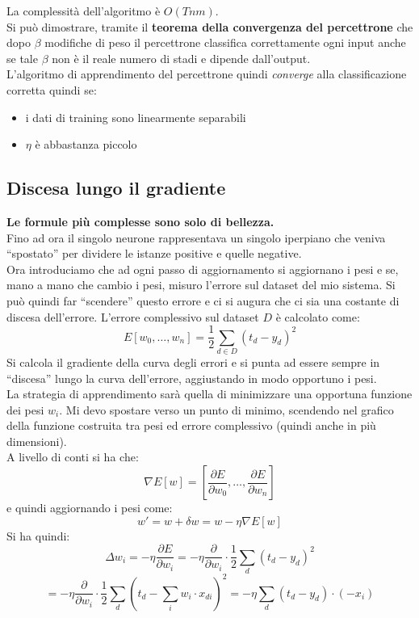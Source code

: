 \documentclass[a4paper,12pt, oneside]{book}
\begin{document}
La complessità dell'algoritmo è $O(Tnm)$.\\
Si può dimostrare, tramite il \textbf{teorema della convergenza del percettrone}
che dopo $\beta$ modifiche di peso il percettrone classifica 
correttamente ogni input anche se tale $\beta$ non è il reale numero di stadi e
dipende dall'output.\\
L'algoritmo di apprendimento del percettrone quindi \textit{converge} alla
classificazione corretta quindi se:
\begin{itemize}
  \item i dati di training sono linearmente separabili
  \item $\eta$ è abbastanza piccolo
\end{itemize}
\subsection{Discesa lungo il gradiente}
\textbf{Le formule più complesse sono solo di bellezza.}\\
\noindent
Fino ad ora il singolo neurone rappresentava un singolo iperpiano che veniva
``spostato'' per dividere le istanze positive e quelle negative.\\
Ora introduciamo che ad ogni passo di aggiornamento si aggiornano i pesi e se,
mano a mano che cambio i pesi, misuro l'errore sul dataset del mio sistema. Si
può quindi far ``scendere'' questo errore e ci si augura che ci sia una costante
di discesa dell'errore. L'errore complessivo sul dataset $D$ è calcolato come:
\[E[w_0,\ldots, w_n]=\frac{1}{2}\sum_{d\in D}(t_d-y_d)^2\]
Si calcola il gradiente della curva degli errori e si punta ad essere sempre in
``discesa'' lungo la curva dell'errore, aggiustando in modo opportuno i pesi.\\
La strategia di apprendimento sarà quella di minimizzare una opportuna
funzione dei pesi $w_i$. Mi devo spostare verso un punto di minimo, scendendo
nel grafico della funzione costruita tra pesi ed errore complessivo (quindi
anche in più dimensioni).\\
A livello di conti si ha che:
\[\nabla E[w]=\left[\frac{\partial E}{\partial w_0},\ldots,\frac{\partial
      E}{\partial w_n}\right]\]
e quindi aggiornando i pesi come:
\[w'=w+\delta w= w-\eta\nabla E[w]\]
Si ha quindi:
\[\Delta w_i=-\eta\frac{\partial E}{\partial w_i}=-\eta\frac{\partial}{\partial
    w_i}\cdot \frac{1}{2}\sum_d (t_d-y_d)^2\]
\[=-\eta\frac{\partial}{\partial
    w_i}\cdot \frac{1}{2}\sum_d (t_d-\sum_i w_i\cdot x_{di})^2=
  -\eta\sum_d(t_d-y_d)\cdot(-x_i)\]
\end{document}
